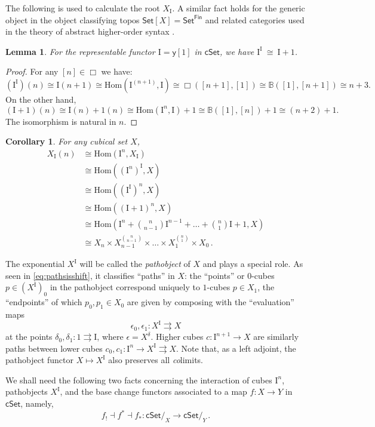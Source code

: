 \documentclass[11pt,reqno]{amsart}
\newcommand{\B}{\ensuremath{\mathbb{B}}}
\newcommand{\Set}{\ensuremath{\mathsf{Set}}}
\newcommand{\cSet}{\ensuremath{\mathsf{cSet}}}
\newcommand{\slice}[1]{\ensuremath{/_{\!{#1}}}}
\newcommand{\y}{\ensuremath{\mathsf{y}}} %
\renewcommand{\to}{\ensuremath{\rightarrow}}
\newcommand{\too}{\ensuremath{\longrightarrow}}
\newcommand{\Hom}{\ensuremath{\mathrm{Hom}}}
\renewcommand{\hom}{\ensuremath{\mathrm{Hom}}}
\newcommand{\I}{\ensuremath{\mathrm{I}}}
\renewcommand{\H}{\ensuremath{\Box}}
\newtheorem{lemma}[theorem]{Lemma}
\newtheorem{corollary}[theorem]{Corollary}
\theoremstyle{remark}
\theoremstyle{definition}
\begin{document}
The following is used to calculate the root $X_\I$. A similar fact holds for the generic object in the object classifying topos $\Set[X]=\Set^{\mathsf{Fin}}$ and related categories used in the theory of abstract higher-order syntax \cite{FiorePlotkinTuri:1999}.

\begin{lemma}\label{lemma:binomial}
For the representable functor $\I = \y[1]$ in $\cSet$, we have $\I^\I\ \cong\ \I+1$.
\end{lemma}
\begin{proof}
For any $[n] \in \H$ we have:
\[
(\I^\I)(n) \cong \I(n+1) \cong \Hom(\I^{(n+1)},\I)\cong \H([n+1],[1])\cong \B([1], [n+1])\cong n+3.
\]
On the other hand,
\[
(\I+1)(n) \cong \I(n) + 1(n) \cong \Hom(\I^n, \I) + 1 \cong \B([1],[n]) +1 \cong (n+2) +1.
\]
The isomorphism is natural in $n$.
\end{proof}

\begin{corollary} For any cubical set $X$,
\begin{align*}\textstyle
X_\I(n) &\cong \hom(\I^n, X_\I) \\
&\cong \hom((\I^n)^\I, X) \\
&\cong \hom((\I^\I)^n, X) \\
&\cong \hom((\I+1)^n, X) \\
&\cong \hom(\I^n +  {\textstyle{n\choose n-1}}\I^{n-1} + \dots + {\textstyle{n\choose 1}}\I+1, X) \\
&\cong X_n \times X_{n-1}^{\binom{n}{n-1}} \times \dots \times X_1^{\binom{n}{1}}\times X_0\,.
\end{align*}
\end{corollary}

The exponential  $X^\I$ will be called the \emph{pathobject} of $X$ and plays a special role.  As seen in \eqref{eq:pathsisshift}, it classifies ``paths'' in $X$: the ``points'' or $0$-cubes $p \in (X^\I)_0$ in the pathobject correspond uniquely to $1$-cubes $p\in X_1$, the ``endpoints'' of which $p_0, p_1\in X_0$ are given by composing with the ``evaluation'' maps 
\[
\epsilon_0, \epsilon_1 : X^\I \rightrightarrows X
\]
at the points $\delta_0, \delta_1 : 1\rightrightarrows \I$, where $\epsilon = X^{\delta}$. Higher cubes $c : \I^{n+1}\to X$ are similarly paths between lower cubes $c_0, c_1 : \I^{n}\to X^\I \rightrightarrows X$.
Note that, as a left adjoint, the pathobject functor $X\mapsto X^\I$ also preserves all \emph{co}limits.   

We shall need the following two facts concerning the interaction of cubes $\I^n$, pathobjects $X^\I$, and the base change functors associated to a map $f : X\to Y$  in $\cSet$, namely,
\[
f_!\dashv f^* \dashv f_* : \cSet\slice{X} \too \cSet\slice{Y}\,.
\]
\end{document}
